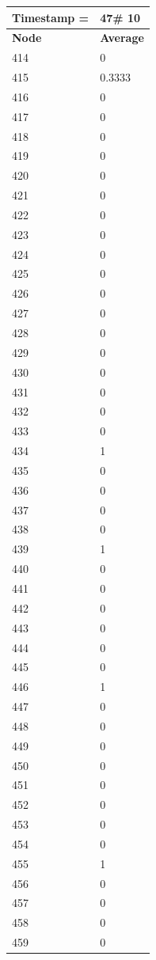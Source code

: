 \begin{tabular}{|l||l|}
\hline
\textbf{Timestamp =} & \textbf{47}\# 10\\\hline
	\textbf{Node} & \textbf{Average} \\ \hline
\hline
	414 & 0 \\ \hline
	415 & 0.3333 \\ \hline
	416 & 0 \\ \hline
	417 & 0 \\ \hline
	418 & 0 \\ \hline
	419 & 0 \\ \hline
	420 & 0 \\ \hline
	421 & 0 \\ \hline
	422 & 0 \\ \hline
	423 & 0 \\ \hline
	424 & 0 \\ \hline
	425 & 0 \\ \hline
	426 & 0 \\ \hline
	427 & 0 \\ \hline
	428 & 0 \\ \hline
	429 & 0 \\ \hline
	430 & 0 \\ \hline
	431 & 0 \\ \hline
	432 & 0 \\ \hline
	433 & 0 \\ \hline
	434 & 1 \\ \hline
	435 & 0 \\ \hline
	436 & 0 \\ \hline
	437 & 0 \\ \hline
	438 & 0 \\ \hline
	439 & 1 \\ \hline
	440 & 0 \\ \hline
	441 & 0 \\ \hline
	442 & 0 \\ \hline
	443 & 0 \\ \hline
	444 & 0 \\ \hline
	445 & 0 \\ \hline
	446 & 1 \\ \hline
	447 & 0 \\ \hline
	448 & 0 \\ \hline
	449 & 0 \\ \hline
	450 & 0 \\ \hline
	451 & 0 \\ \hline
	452 & 0 \\ \hline
	453 & 0 \\ \hline
	454 & 0 \\ \hline
	455 & 1 \\ \hline
	456 & 0 \\ \hline
	457 & 0 \\ \hline
	458 & 0 \\ \hline
	459 & 0 \\ \hline
\end{tabular}
